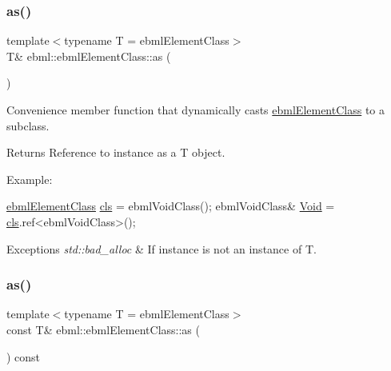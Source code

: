 \mbox{\label{classebml_1_1ebmlElementClass_ab8c68b1f0a25aead5003d7100a27d5d3}} 
\subsubsection{\texorpdfstring{as()}{as()}\hspace{0.1cm}{\footnotesize\ttfamily [1/2]}}
{\footnotesize\ttfamily template$<$typename T  = ebml\+Element\+Class$>$ \\
T\& ebml\+::ebml\+Element\+Class\+::as (\begin{DoxyParamCaption}{ }\end{DoxyParamCaption})\hspace{0.3cm}{\ttfamily [inline]}}

Convenience member function that dynamically casts \mbox{\hyperlink{classebml_1_1ebmlElementClass}{ebml\+Element\+Class}} to a subclass.

\begin{DoxyReturn}{Returns}
Reference to instance as a T object.
\end{DoxyReturn}
Example\+: 
\begin{DoxyCode}
\mbox{\hyperlink{classebml_1_1ebmlElementClass_a6c2081870c5d66c70e0cf988ff253420}{ebmlElementClass}} \mbox{\hyperlink{classebml_1_1ebmlElement_a15cf59e94b01e2c49ec96512b9bd9d90}{cls}} = ebmlVoidClass();
ebmlVoidClass& \mbox{\hyperlink{namespaceebml_afbfd509d1cb71e416a07253746e886e9}{Void}} = \mbox{\hyperlink{classebml_1_1ebmlElement_a15cf59e94b01e2c49ec96512b9bd9d90}{cls}}.ref<ebmlVoidClass>();
\end{DoxyCode}
 
\begin{DoxyExceptions}{Exceptions}
{\em std\+::bad\+\_\+alloc} & If instance is not an instance of T. \\
\hline
\end{DoxyExceptions}
\mbox{\label{classebml_1_1ebmlElementClass_a5d49c645d8b92ef330e5960a02f2fbf7}} 
\subsubsection{\texorpdfstring{as()}{as()}\hspace{0.1cm}{\footnotesize\ttfamily [2/2]}}
{\footnotesize\ttfamily template$<$typename T  = ebml\+Element\+Class$>$ \\
const T\& ebml\+::ebml\+Element\+Class\+::as (\begin{DoxyParamCaption}{ }\end{DoxyParamCaption}) const\hspace{0.3cm}{\ttfamily [inline]}}

